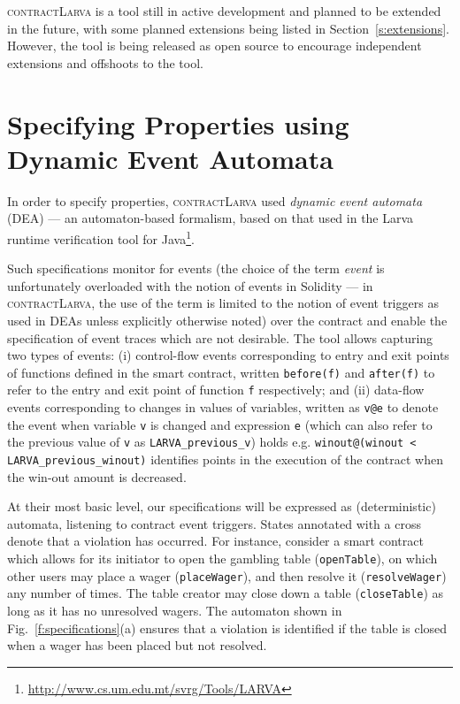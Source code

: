 \documentclass{article}
\newcommand{\contractlarva}{\textsc{contractLarva}\xspace}
\begin{document}
 \contractlarva is a tool still in active development and planned to be extended in the future, with some planned extensions being listed in Section~\ref{s:extensions}. However, the tool is being released as open source to encourage independent extensions and offshoots to the tool.

  \section{Specifying Properties using Dynamic Event Automata}
  \label{s:deas}

  In order to specify properties, \contractlarva used \emph{dynamic event automata} (DEA) --- an automaton-based formalism, based on that used in the Larva runtime verification tool for Java\footnote{\url{http://www.cs.um.edu.mt/svrg/Tools/LARVA}}. 
  
Such specifications monitor for events (the choice of the term \emph{event} is unfortunately overloaded with the notion of events in Solidity --- in \contractlarva, the use of the term is limited to the notion of event triggers as used in DEAs unless explicitly otherwise noted) over the contract and enable the specification of event traces which are not desirable. The tool allows capturing two types of events: (i) control-flow events corresponding to entry and exit points of functions defined in the smart contract, written \texttt{before(f)} and \texttt{after(f)} to refer to the entry and exit point of function \texttt{f} respectively; and (ii) data-flow events corresponding to changes in values of variables, written as \texttt{v@e} to denote the event when variable \texttt{v} is changed and expression \texttt{e} (which can also refer to the previous value of \texttt{v} as \texttt{LARVA\_previous\_v}) holds e.g. \texttt{winout@(winout < LARVA\_previous\_winout)} identifies points in the execution of the contract when the win-out amount is decreased. 

At their most basic level, our specifications will be expressed as (deterministic) automata, listening to contract event triggers. States annotated with a cross denote that a violation has occurred. For instance, consider a smart contract which allows for its initiator to open the gambling table (\texttt{openTable}), on which other users may place a wager (\texttt{placeWager}), and then resolve it (\texttt{resolveWager}) any number of times. The table creator may close down a table (\texttt{closeTable}) as long as it has no unresolved wagers. The automaton shown in Fig.~\ref{f:specifications}(a) ensures that a violation is identified if the table is closed when a wager has been placed but not resolved.
\end{document}
